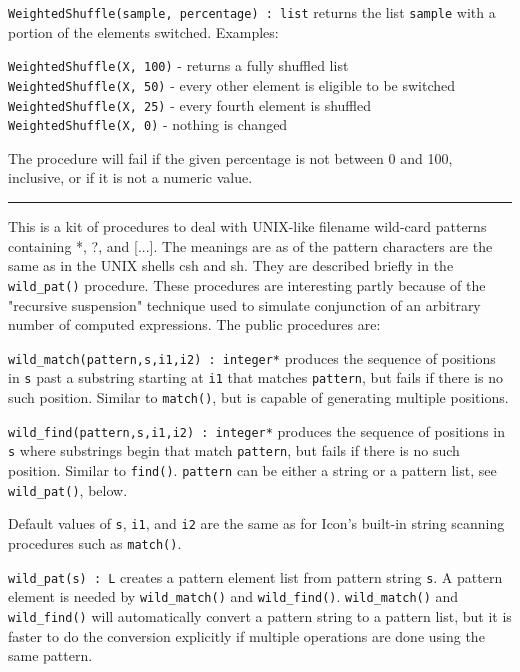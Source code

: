 \texttt{WeightedShuffle(sample, percentage) : list} returns the list
\texttt{sample} with a portion of the elements switched. Examples:

\texttt{WeightedShuffle(X, 100)} - returns a fully shuffled list\\
\texttt{WeightedShuffle(X, 50)} - every other element is eligible to be
switched\\
\texttt{WeightedShuffle(X, 25)} - every fourth element is
shuffled\\
\texttt{WeightedShuffle(X, 0)} - nothing is changed

The procedure will fail if the given percentage is not between 0 and
100, inclusive, or if it is not a numeric value.

\vspace{0.25cm}\hrule{}

This is a kit of procedures to deal with UNIX-like filename
wild-card patterns containing *, ?, and
[...]. The meanings are as of the pattern characters are the same as in
the UNIX shells csh and sh. They are described briefly in the
\texttt{wild\_pat()} procedure. These procedures are interesting partly
because of the "recursive suspension"
technique used to simulate conjunction of an arbitrary number of
computed expressions. The public procedures are:

\texttt{wild\_match(pattern,s,i1,i2) : integer*} produces the sequence
of positions in \texttt{s} past a substring starting at \texttt{i1}
that matches \texttt{pattern}, but fails if there is no such position.
Similar to \texttt{match()}, but is capable of generating multiple
positions.

\texttt{wild\_find(pattern,s,i1,i2) : integer*} produces the sequence of
positions in \texttt{s} where substrings begin that match
\texttt{pattern}, but fails if there is no such position. Similar to
\texttt{find()}. \texttt{pattern} can be either a string or a pattern
list, see \texttt{wild\_pat()}, below.

Default values of \texttt{s}, \texttt{i1}, and \texttt{i2} are the same
as for Icon's built-in string scanning procedures such
as \texttt{match()}.

\texttt{wild\_pat(s) : L} creates a pattern element list from pattern
string \texttt{s}. A pattern element is needed by
\texttt{wild\_match()} and \texttt{wild\_find()}.
\texttt{wild\_match()} and \texttt{wild\_find()} will automatically
convert a pattern string to a pattern list, but it is faster to do the
conversion explicitly if multiple operations are done using the same
pattern.

